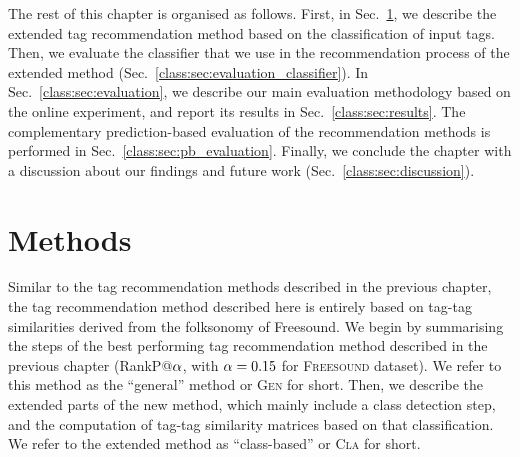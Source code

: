 
The rest of this chapter is organised as follows. 
First, in Sec.~\ref{class:sec:methods}, we describe the extended tag recommendation method based on the classification of input tags. 
Then, we evaluate the classifier that we use in the recommendation process of the extended method (Sec.~\ref{class:sec:evaluation_classifier}).
In Sec.~\ref{class:sec:evaluation}, we describe our main evaluation methodology based on the online experiment, and report its results in Sec.~\ref{class:sec:results}.
The complementary prediction-based evaluation of the recommendation methods is performed in Sec.~\ref{class:sec:pb_evaluation}. 
Finally, we conclude the chapter with a discussion about our findings and future work (Sec.~\ref{class:sec:discussion}).


\section{Methods}
\label{class:sec:methods}

Similar to the tag recommendation methods described in the previous chapter, the tag recommendation method described here is entirely based on tag-tag similarities derived from the folksonomy of Freesound. 
We begin by summarising the steps of the best performing tag recommendation method described in the previous chapter (RankP@$\alpha$, with $\alpha=0.15$ for \textsc{Freesound} dataset). %
We refer to this method as the ``general'' method or \textsc{Gen} for short. Then, we describe the extended parts of the new method, which mainly include a class detection step, and the computation of tag-tag similarity matrices based on that classification. We refer to the extended method as ``class-based'' or \textsc{Cla} for short.

